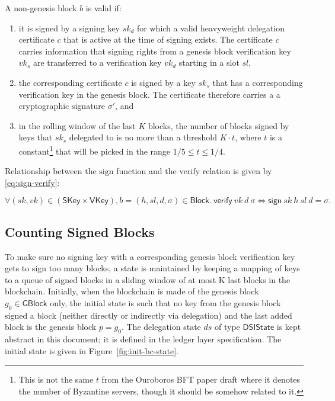 \documentclass[11pt,a4paper]{article}
\newcommand{\var}[1]{\mathit{#1}}
\newcommand{\fun}[1]{\mathsf{#1}}
\newcommand{\type}[1]{\mathsf{#1}}
\newcommand{\GBlock}{\type{GBlock}}
\newcommand{\Block}{\type{Block}}
\newcommand{\SKey}{\type{SKey}}
\newcommand{\VKey}{\type{VKey}}
\newcommand{\DelegState}{\type{DSIState}}
\newcommand{\signname}{sign}
\newcommand{\verifyname}{verify}
\newcommand{\sign}[4]{\fun{\signname}\ #1 ~ #2 ~ #3 ~ #4}
\newcommand{\verify}[3]{\fun{\verifyname} ~ #1 ~ #2 ~ #3}
\begin{document}
A non-genesis block $\var{b}$ is valid if:
%
\begin{enumerate}
\item it is signed by a signing key $sk_d$ for which a valid heavyweight
  delegation certificate $c$ that is active at the time of signing exists.
  The certificate $c$ carries information that signing rights from a genesis
  block verification key $vk_s$ are transferred to a verification key $vk_d$
  starting in a slot $sl$,
\item the corresponding certificate $c$ is signed by a key $sk_s$ that has a
  corresponding verification key in the genesis block.
  The certificate therefore carries a a cryptographic signature $\sigma'$,
  and
\item in the rolling window of the last $K$ blocks, the number of blocks
  signed by keys that $sk_s$ delegated to is no more than a threshold
  $K \cdot t$, where $t$ is a constant\footnote{This is not the same $t$ from
    the Ouroboros BFT paper draft where it denotes the number of Byzantine
    servers, though it should be somehow related to it.}  that will be picked
  in the range $1/5 \leq t \leq 1/4$.
\end{enumerate}

Relationship between the $\text{\signname}$ function and the
$\text{\verifyname}$ relation is given by \eqref{eq:sign-verify}:

\begin{equation}
  \label{eq:sign-verify}
  \forall (sk, vk) \in (\SKey \times \VKey), b = (h, sl, d, \sigma) \in \Block.\
  \verify{vk}{d}{\sigma} \iff \sign{sk}{h}{sl}{d} = \sigma.
\end{equation}


\subsection{Counting Signed Blocks}
\label{sec:counting-signed-blocks}

To make sure no signing key with a corresponding genesis block verification
key gets to sign too many blocks, a state is maintained by keeping a mapping
of keys to a queue of signed blocks in a sliding window of at most K last
blocks in the blockchain.
%
Initially, when the blockchain is made of the genesis block $g_0 \in \GBlock$
only, the initial state is such that no key from the genesis block signed a
block (neither directly or indirectly via delegation) and the last added block
is the genesis block $p = g_0$.
%
The delegation state $ds$ of type $\DelegState$ is kept abstract in this
document;
%
it is defined in the ledger layer specification.
%
The initial state is given in Figure~\ref{fig:init-bc-state}.
\end{document}
